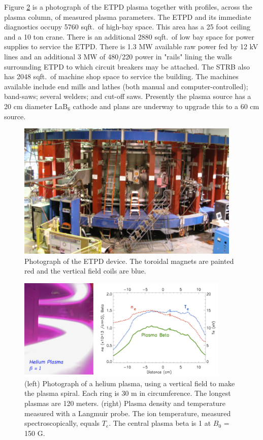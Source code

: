 \documentclass[11pt]{article}
\begin{document}
Figure \ref{fig:etpd2} is a photograph of the ETPD plasma together with profiles, across the plasma column, of measured plasma parameters.  The ETPD and its immediate diagnostics occupy 5760 sqft.\ of high-bay space.  This area has a 25 foot ceiling and a 10 ton crane.  There is an additional 2880 sqft.\ of low bay space for power supplies to service the ETPD.  There is 1.3 MW available raw power fed by 12 kV lines and an additional 3 MW of 480/220 power in "rails" lining the walls surrounding ETPD to which circuit breakers may be attached.  The STRB also has 2048 sqft.\ of machine shop space to service the building.  The machines available include end mills and lathes (both manual and computer-controlled); band-saws; several welders; and cut-off saws.  Presently the plasma source has a 20 cm diameter LaB$_{6}$ cathode and plans are underway to upgrade this to a 60 cm source.
\begin{figure}[h] %
   \centering
   \includegraphics[width=0.95\textwidth]{ETPD.jpg} 
   \caption{\small Photograph of the ETPD device.  The toroidal magnets are painted red and the vertical field coils are blue.}
   \label{fig:etpd}
\end{figure}
\begin{figure}[h] %
   \centering
   \includegraphics[width=0.9\textwidth]{etpd2.jpg} 
   \caption{\small (left) Photograph of a helium plasma, using a vertical field to make the plasma spiral.  Each ring is 30 m in circumference.  The longest plasmas are 120 meters. (right) Plasma density and temperature measured with a Langmuir probe.  The ion temperature, measured spectroscopically, equals $T_{e}$. The central plasma beta is 1 at $B_{0}$ = 150 G.  }
   \label{fig:etpd2}
\end{figure}
\end{document}
